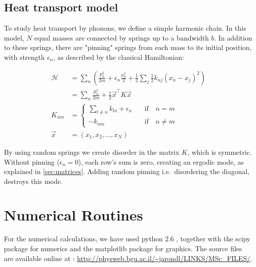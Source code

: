 \section{Heat transport model}\label{sec:app_heat}

To study heat transport by phonons, we define a simple harmonic chain.
In this model,
$N$ equal masses are connected by springs up to a bandwidth $b$. In addition to these
springs, there are "pinning" springs from each mass to its initial position, with
strength $\epsilon_n$, as described by the classical Hamiltonian:

\begin{align}
\mathcal{H} &= \sum_n \left( \frac{p_n^2}{2m} +\epsilon_n\frac{x_n^2}{2}+ \frac{1}{2}\sum_{j} \frac{1}{2}k_{nj} (x_n-x_j)^2 \right) \\
            &= \sum_{n} \frac{p_n^2}{2m} +  \frac{1}{2}\vec{x}^{\intercal} K \vec{x} \\
            K_{nm} &= \begin{cases} 
            \sum_{l\ne n} k_{ln} +\epsilon_n \quad &\textrm{if}\quad n=m \\ 
            - k_{nm}  \quad &\textrm{if}\quad n\ne m
            \end{cases}\\
            \vec{x} &= (x_1,x_2,\ldots,x_N)
\end{align}

By using random springs we create disorder in the matrix $K$, which
is symmetric. Without pinning ($\epsilon_n=0$), each row's sum is zero,
creating an ergodic mode, as explained in \ref{sec:matrices}. Adding random pinning i.e.\ disordering the diagonal,
destroys this mode.



\chapter{Numerical Routines}

For the numerical calculations, we have used python 2.6 \cite{guido_van_rossum_python_????}, together
with the scipy \cite{jones_scipy:_2001} package for numerics and the matplotlib \cite{hunter_matplotlib:_2007} package
for graphics. The source files are available online at : 
\url{http://physweb.bgu.ac.il/~jarondl/LINKS/MSc_FILES/}.


